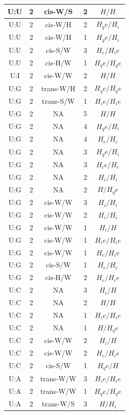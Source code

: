 \begin{center}
\begin{longtable}{c|c|c|c|c}
U:U & 2 & cis-W/S & 2 & $H/H$ \\  \hline
U:U & 2 & cis-W/H & 2 & $H_qe/H_i$ \\  \hline
U:U & 2 & cis-W/H & 1 & $H_qe/H_i$ \\  \hline
U:U & 2 & cis-S/W & 3 & $H_e/H_ie$ \\  \hline
U:U & 2 & cis-H/W & 1 & $H_qe/H_qe$ \\  \hline
U:I & 2 & cis-W/W & 2 & $H/H$ \\  \hline
U:G & 2 & trans-W/H & 2 & $H_qe/H_qe$ \\  \hline
U:G & 2 & trans-S/W & 1 & $H_ie/H_ie$ \\  \hline
U:G & 2 & NA & 5 & $H/H$ \\  \hline
U:G & 2 & NA & 4 & $H_qe/H_i$ \\  \hline
U:G & 2 & NA & 4 & $H_e/H_e$ \\  \hline
U:G & 2 & NA & 3 & $H_qe/H_i$ \\  \hline
U:G & 2 & NA & 3 & $H_ie/H_e$ \\  \hline
U:G & 2 & NA & 2 & $H_i/H_i$ \\  \hline
U:G & 2 & NA & 2 & $H/H_qe$ \\  \hline
U:G & 2 & cis-W/W & 3 & $H_i/H_i$ \\  \hline
U:G & 2 & cis-W/W & 2 & $H_i/H_i$ \\  \hline
U:G & 2 & cis-W/W & 1 & $H_i/H$ \\  \hline
U:G & 2 & cis-W/W & 1 & $H_ie/H_ie$ \\  \hline
U:G & 2 & cis-W/W & 1 & $H_e/H_ie$ \\  \hline
U:G & 2 & cis-S/W & 1 & $H_e/H_e$ \\  \hline
U:G & 2 & cis-H/W & 2 & $H_e/H_ie$ \\  \hline
U:C & 2 & NA & 3 & $H_i/H$ \\  \hline
U:C & 2 & NA & 2 & $H/H$ \\  \hline
U:C & 2 & NA & 1 & $H_ie/H_ie$ \\  \hline
U:C & 2 & NA & 1 & $H/H_qe$ \\  \hline
U:C & 2 & cis-W/W & 2 & $H_i/H$ \\  \hline
U:C & 2 & cis-W/W & 2 & $H_e/H_ie$ \\  \hline
U:C & 2 & cis-S/W & 1 & $H_qe/H$ \\  \hline
U:A & 2 & trans-W/W & 3 & $H_ie/H_ie$ \\  \hline
U:A & 2 & trans-W/W & 1 & $H_qe/H_qe$ \\  \hline
U:A & 2 & trans-W/S & 3 & $H/H_i$ \\  \hline

\end{longtable}
\end{center}
